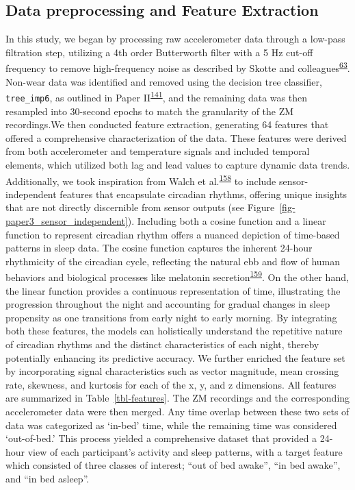 \documentclass[
  10pt,
]{scrbook}
\begin{document}
\hypertarget{data-preprocessing-and-feature-extraction}{%
\subsection{Data preprocessing and Feature
Extraction}\label{data-preprocessing-and-feature-extraction}}

In this study, we began by processing raw accelerometer data through a
low-pass filtration step, utilizing a 4th order Butterworth filter with
a 5 Hz cut-off frequency to remove high-frequency noise as described by
Skotte and
colleagues\textsuperscript{\protect\hyperlink{ref-skotte_detection_2014}{63}}.
Non-wear data was identified and removed using the decision tree
classifier, \texttt{tree\_imp6}, as outlined in Paper
II\textsuperscript{\protect\hyperlink{ref-skovgaard_generalizability_2023}{141}},
and the remaining data was then resampled into 30-second epochs to match
the granularity of the ZM recordings.We then conducted feature
extraction, generating 64 features that offered a comprehensive
characterization of the data. These features were derived from both
accelerometer and temperature signals and included temporal elements,
which utilized both lag and lead values to capture dynamic data trends.
Additionally, we took inspiration from Walch et
al.\textsuperscript{\protect\hyperlink{ref-walch_sleep_2019}{158}} to
include sensor-independent features that encapsulate circadian rhythms,
offering unique insights that are not directly discernible from sensor
outputs (see Figure~\ref{fig-paper3_sensor_independent}). Including both
a cosine function and a linear function to represent circadian rhythm
offers a nuanced depiction of time-based patterns in sleep data. The
cosine function captures the inherent 24-hour rhythmicity of the
circadian cycle, reflecting the natural ebb and flow of human behaviors
and biological processes like melatonin
secretion\textsuperscript{\protect\hyperlink{ref-lewy_1980}{159}}. On
the other hand, the linear function provides a continuous representation
of time, illustrating the progression throughout the night and
accounting for gradual changes in sleep propensity as one transitions
from early night to early morning. By integrating both these features,
the models can holistically understand the repetitive nature of
circadian rhythms and the distinct characteristics of each night,
thereby potentially enhancing its predictive accuracy. We further
enriched the feature set by incorporating signal characteristics such as
vector magnitude, mean crossing rate, skewness, and kurtosis for each of
the x, y, and z dimensions. All features are summarized in
Table~\ref{tbl-features}. The ZM recordings and the corresponding
accelerometer data were then merged. Any time overlap between these two
sets of data was categorized as `in-bed' time, while the remaining time
was considered `out-of-bed.' This process yielded a comprehensive
dataset that provided a 24-hour view of each participant's activity and
sleep patterns, with a target feature which consisted of three classes
of interest; ``out of bed awake'', ``in bed awake'', and ``in bed
asleep''.
\end{document}
